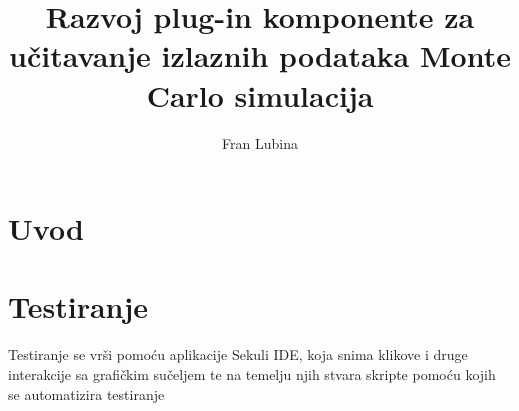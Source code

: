 \documentclass[times, utf8, zavrsni]{fer}
\begin{document}

\title{Razvoj plug-in komponente za učitavanje izlaznih podataka Monte Carlo simulacija}


\author{Fran Lubina}

\maketitle

\izvornik


\tableofcontents

\chapter{Uvod}

\chapter{Testiranje}
Testiranje se vrši pomoću aplikacije Sekuli IDE, koja snima klikove i druge interakcije sa grafičkim sučeljem te na temelju njih stvara skripte pomoću kojih se automatizira testiranje
	
\end{document}
